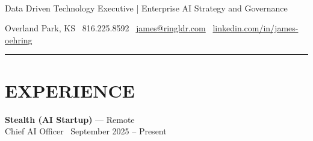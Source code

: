 \documentclass[10pt]{article}
\newcommand{\roleheader}[4]{%
  \noindent\textbf{#1} --- #2\\
  #3 \textperiodcentered\ #4\par\vspace{0.04in}
}
\begin{document}
\\
Data Driven Technology Executive | Enterprise AI Strategy and Governance

\noindent
Overland Park, KS \textperiodcentered\ 816.225.8592 \textperiodcentered\ \href{mailto:james@ringldr.com}{james@ringldr.com} \textperiodcentered\ \href{https://linkedin.com/in/james-oehring}{linkedin.com/in/james-oehring}

\vspace{0.1in}
\noindent\rule{\textwidth}{0.5pt}

\section*{EXPERIENCE}

\roleheader{Stealth (AI Startup)}{Remote}{Chief AI Officer}{September 2025 -- Present}
\end{document}
